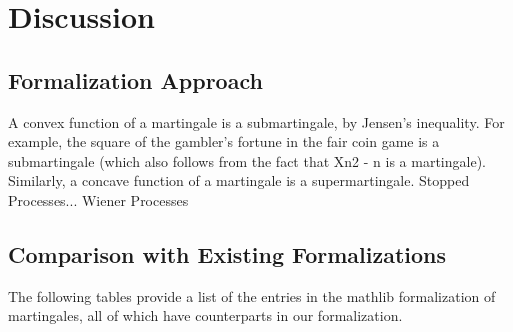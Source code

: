 
\chapter{Discussion}\label{chapter:discussion}

\section{Formalization Approach}

A convex function of a martingale is a submartingale, by Jensen's inequality. For example, the square of the gambler's fortune in the fair coin game is a submartingale (which also follows from the fact that Xn2 - n is a martingale). Similarly, a concave function of a martingale is a supermartingale. Stopped Processes... Wiener Processes

\section{Comparison with Existing Formalizations}

The following tables provide a list of the entries in the \textsf{mathlib} formalization of martingales, all of which have counterparts in our formalization.

